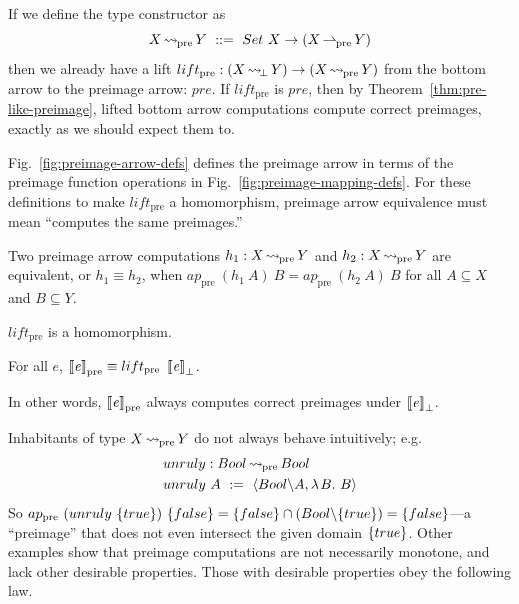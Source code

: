 \documentclass{llncs}
\newcommand{\figref}[1]{Fig.~\ref{#1}}
\newcommand{\arrow}{\rightsquigarrow}
\newcommand{\pto}{\rightharpoonup}
\newcommand{\pre}{_\mathrm{pre}}
\DeclareMathOperator{\botto}{{\arrow\mspace{-3mu}}_\bot}
\DeclareMathOperator{\preto}{{\arrow\mspace{-1mu}}\pre}
\DeclareMathOperator{\prepto}{{\pto\mspace{-1mu}}\pre}
\begin{document}
If we define the  type constructor as
\begin{equation}
	X \preto Y \ ::= \ Set~X \to (X \prepto Y)
\end{equation}
then we already have a lift $lift\pre : (X \botto Y) \to (X \preto Y)$ from the bottom arrow to the preimage arrow: $pre$.
If $lift\pre$ is $pre$, then by Theorem~\ref{thm:pre-like-preimage}, lifted bottom arrow computations compute correct preimages, exactly as we should expect them to.

\figref{fig:preimage-arrow-defs} defines the preimage arrow in terms of the preimage function operations in \figref{fig:preimage-mapping-defs}.
For these definitions to make $lift\pre$ a homomorphism, preimage arrow equivalence must mean ``computes the same preimages.''

\begin{definition}
Two preimage arrow computations $h_1 : X \preto Y$ and $h_2 : X \preto Y$ are equivalent, or $h_1 \equiv h_2$, when 
$ap\pre~(h_1~A)~B = ap\pre~(h_2~A)~B$ for all $A \subseteq X$ and $B \subseteq Y$.
\end{definition}

\begin{theorem}
$lift\pre$ is a homomorphism.
\end{theorem}

\begin{corollary}
\label{cor:preimage-arrow-correctness}
For all $\mathit{e}$, $\meaningof{\mathit{e}}\pre \equiv lift\pre~\meaningof{\mathit{e}}_\bot$.
\end{corollary}

In other words, $\meaningof{\mathit{e}}\pre$ always computes correct preimages under $\left\llbracket{\mathit{e}}\right\rrbracket_\bot$.

Inhabitants of type $X \preto Y$ do not always behave intuitively; e.g.
\begin{equation}
\begin{aligned}
	&unruly : Bool \preto Bool \\
	&unruly~A \ := \ \pair{Bool \w A, \fun{B} B}
\end{aligned}
\end{equation}
So $ap\pre~(unruly~\set{true})~\set{false} = \set{false} \i (Bool \w \set{true}) = \set{false}$---a ``preimage'' that does not even intersect the given domain $\{{true}\}$.
Other examples show that preimage computations are not necessarily monotone, and lack other desirable properties.
Those with desirable properties obey the following law.
\end{document}
